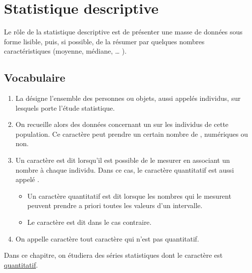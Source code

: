

\chapter{Statistique descriptive}


Le rôle de la statistique descriptive est de présenter une masse de
données sous forme lisible, puis, si possible, de la résumer par
quelques nombres caractéristiques (moyenne, médiane, {\ldots} ).




\section{Vocabulaire}

\begin{enumerate}
    \item La  désigne l'ensemble des personnes ou objets,
  aussi appelés individus, sur lesquels porte l'étude
  statistique.  
\item On recueille alors des données concernant un  sur
  les individus de cette population. Ce caractère peut prendre un
  certain nombre de , numériques ou non.
\item Un caractère est dit  lorsqu'il est possible de
  le mesurer en associant un nombre à chaque individu. Dans ce cas, le
  caractère quantitatif est aussi appelé .
  \begin{itemize}
      \item Un caractère quantitatif est dit  lorsque les
    nombres qui le mesurent peuvent prendre a priori toutes les
    valeurs d'un intervalle.
\item Le caractère est dit  dans le cas contraire.
  \end{itemize}
\item On appelle caractère  tout caractère qui n'est
  pas quantitatif.
\end{enumerate}
Dans ce chapitre, on étudiera des séries statistiques dont le
caractère est \underline{quantitatif}.



